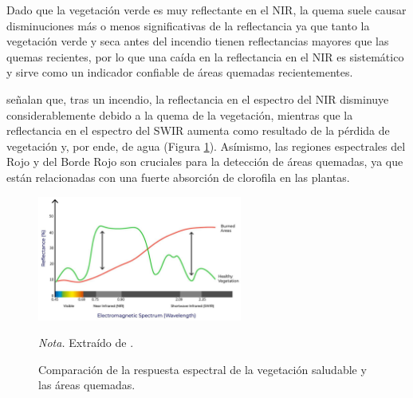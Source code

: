 Dado que la vegetación verde es muy reflectante en el NIR, la quema suele 
causar disminuciones más o menos significativas de la reflectancia ya que tanto la vegetación verde y seca antes del incendio tienen reflectancias mayores que las quemas recientes, por lo que una caída en la reflectancia en el NIR es sistemático y sirve como un indicador confiable de áreas quemadas recientementes.

\citet{alcaras_2022} señalan que, tras un incendio, la reflectancia en el espectro del NIR disminuye considerablemente debido a la quema de la vegetación, mientras que la reflectancia en el espectro del SWIR aumenta como resultado de la pérdida de vegetación y, por ende, de agua (Figura \ref{fig:firma_espectral}). Asímismo, las regiones espectrales del Rojo y del Borde 
Rojo son cruciales para la detección de áreas quemadas, ya que están relacionadas con una fuerte absorción de clorofila en las plantas.

\begin{figure}[H]
    \centering
    \caption{Comparación de la respuesta espectral de la vegetación saludable y las áreas quemadas.}
    \includegraphics[width=0.6\textwidth]{img/4_marco_teorico/burned_areas_spectral.png}
    \label{fig:firma_espectral}
    \begin{flushleft}
        \textit{Nota.} Extraído de \citet{alcaras_2022}. 
        \vspace{-\baselineskip}
    \end{flushleft}
\end{figure}

